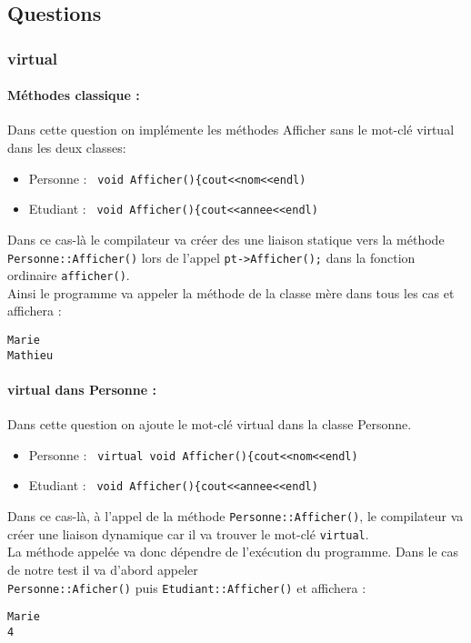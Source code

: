 \documentclass[10pt,a4paper,twoside]{article}
\begin{document}
\subsection{Questions}
\subsubsection{virtual}
\paragraph{Méthodes classique :}Dans cette question on implémente les méthodes Afficher sans le mot-clé virtual dans les deux classes:
\begin{itemize}
\item Personne : \verb= void Afficher(){cout<<nom<<endl)=
\item Etudiant : \verb= void Afficher(){cout<<annee<<endl)=
\end{itemize}
Dans ce cas-là le compilateur va créer des une liaison statique vers la méthode \verb=Personne::Afficher()= lors de l'appel \verb=pt->Afficher();= dans la fonction ordinaire \verb=afficher()=.\\
Ainsi le programme va appeler la méthode de la classe mère dans tous les cas et affichera :
\begin{verbatim}
Marie
Mathieu
\end{verbatim}

\paragraph{virtual dans Personne :}Dans cette question on ajoute le mot-clé virtual dans la classe Personne.
\begin{itemize}
\item Personne : \verb= virtual void Afficher(){cout<<nom<<endl)=
\item Etudiant : \verb= void Afficher(){cout<<annee<<endl)=
\end{itemize}
Dans ce cas-là, à l'appel de la méthode \verb=Personne::Afficher()=, le compilateur va créer une liaison dynamique car il va trouver le mot-clé \verb=virtual=.\\
La méthode appelée va donc dépendre de l'exécution du programme. Dans le cas de notre test il va d'abord appeler \\
 \verb=Personne::Aficher()= puis \verb=Etudiant::Afficher()= et affichera :
\begin{verbatim}
Marie
4
\end{verbatim}
\end{document}

